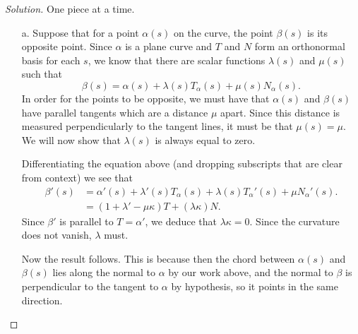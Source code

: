 \documentclass[Shifrin_Solutions_Spring_2018]{subfiles}
\begin{document}
\begin{proof}[Solution]One piece at a time.
\begin{itemize}
\item[a.] Suppose that for a point $\alpha(s)$ on the curve, the point $\beta(s)$ is its 
opposite point. Since $\alpha$ is a plane curve and $T$ and $N$ form an orthonormal basis 
for each $s$, we know that there are scalar functions $\lambda(s)$ and $\mu(s)$ such that
\[
\beta(s) = \alpha(s) + \lambda(s) T_{\alpha}(s) + \mu(s) N_{\alpha}(s) .
\]
In order for the points to be opposite, we must have that $\alpha(s)$ and $\beta(s)$ have 
parallel tangents which are a distance $\mu$ apart. Since this distance is measured 
perpendicularly to the tangent lines, it must be that $\mu(s) = \mu$. We will now show 
that $\lambda(s)$ is always equal to zero.


Differentiating the equation above (and dropping subscripts that are clear from context) 
we see that
\[
\begin{split}
\beta'(s) & = \alpha'(s) + \lambda'(s) T_{\alpha}(s) + \lambda(s) T_{\alpha}'(s) 
+ \mu N_{\alpha}'(s) .\\
	& = ( 1 + {\lambda}' - \mu \kappa ) T + ( \lambda \kappa ) N .
\end{split}
\]
Since $\beta'$ is parallel to $T = \alpha'$, we deduce that $\lambda\kappa= 0$. Since the 
curvature does not vanish, $\lambda$ must.

Now the result follows. This is because then the chord between $\alpha(s)$ and $\beta(s)$ 
lies along the normal to $\alpha$ by our work above, and the normal to $\beta$ is 
perpendicular to the tangent to $\alpha$ by hypothesis, so it points in the same direction. \\



\end{itemize}
\end{proof}
\end{document}
